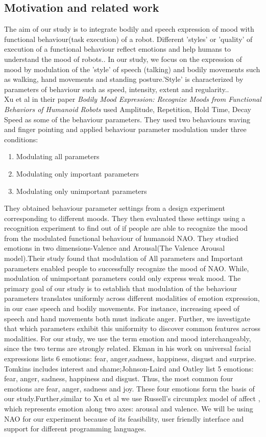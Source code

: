\documentclass[runningheads]{llncs}
\begin{document}
\subsection{Motivation and related work}
The aim of our study is to integrate bodily and speech expression of mood with functional behaviour(task execution) of a robot. Different 'styles' or 'quality' of execution of a functional behaviour reflect emotions and help humans to understand the mood of robots.\cite{joost}. In our study, we focus on the expression of mood by modulation of the 'style' of speech (talking) and bodily movements such as walking, hand movements and standing posture.'Style' is characterized by  parameters of behaviour such as speed, intensity, extent and regularity.\cite{angelica}.\\ Xu et al\cite{joost} in their paper \textit{Bodily Mood Expression: Recognize Moods from Functional Behaviors of Humanoid Robots} used Amplitude, Repetition, Hold Time, Decay Speed as some of the behaviour parameters. They used two behaviours waving and finger pointing and applied behaviour parameter modulation under three conditions:
\begin{enumerate}
    \item Modulating all parameters
    \item Modulating only important parameters
    \item Modulating only unimportant parameters
\end{enumerate}
They obtained behaviour parameter settings from a design experiment corresponding to different moods. They then evaluated these settings using a recognition experiment to find out of if people are able to recognize the mood from the modulated functional behaviour of humanoid NAO.
They studied emotions in two dimensions-Valence and Arousal(The Valence Arousal model\cite{valence}).Their study found that modulation of All parameters and Important parameters enabled people to successfully recognize the mood of NAO. While, modulation of unimportant parameters could only express weak mood.
The primary goal of our study is to establish that modulation of the behaviour parameters translates uniformly across different modalities of emotion expression, in our case speech and bodily movements. For instance, increasing speed of speech and hand movements both must indicate anger. Further, we investigate that which parameters exhibit this uniformity to discover common features across modalities. For our study, we use the term emotion and mood interchangeably, since the two terms are strongly related. Ekman\cite{ekman} in his work on universal facial expressions lists 6 emotions: fear, anger,sadness, happiness, disgust and surprise. Tomkins \cite{tomkins} includes interest and shame;Johnson-Laird and Oatley list 5 emotions: fear, anger, sadness, happiness and disgust\cite{oatley}. Thus, the most common four emotions are fear, anger, sadness and joy\cite{angelica}. These four emotions form the basis of our study.Further,similar to  Xu et al\cite{joost}  we use Russell’s circumplex model of affect \cite{russell}, which represents emotion along two axes: arousal and valence. We will be using NAO for our experiment\cite{nao} because of its feasibility, user friendly interface and support for different programming languages.
\end{document}
